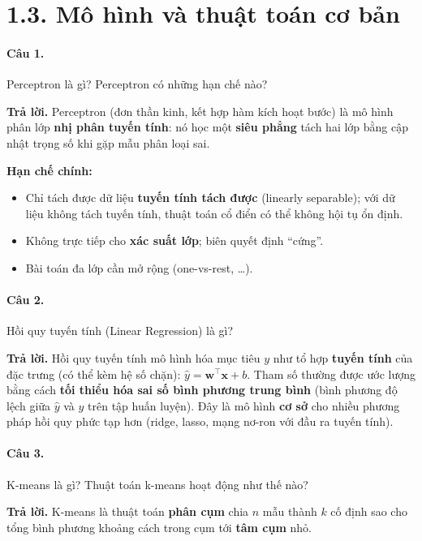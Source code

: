 \section*{1.3. Mô hình và thuật toán cơ bản}

\paragraph{Câu 1.} Perceptron là gì? Perceptron có những hạn chế nào?

\medskip\noindent\textbf{Trả lời.} Perceptron (đơn thần kinh, kết hợp hàm kích hoạt bước) là mô hình phân lớp \textbf{nhị phân tuyến tính}: nó học một \textbf{siêu phẳng} tách hai lớp bằng cập nhật trọng số khi gặp mẫu phân loại sai.

\textbf{Hạn chế chính:}
\begin{itemize}[nosep]
\item Chỉ tách được dữ liệu \textbf{tuyến tính tách được} (linearly separable); với dữ liệu không tách tuyến tính, thuật toán cổ điển có thể không hội tụ ổn định.
\item Không trực tiếp cho \textbf{xác suất lớp}; biên quyết định ``cứng''.
\item Bài toán đa lớp cần mở rộng (one-vs-rest, \ldots).
\end{itemize}

\paragraph{Câu 2.} Hồi quy tuyến tính (Linear Regression) là gì?

\medskip\noindent\textbf{Trả lời.} Hồi quy tuyến tính mô hình hóa mục tiêu $y$ như tổ hợp \textbf{tuyến tính} của đặc trưng (có thể kèm hệ số chặn): $\hat{y} = \mathbf{w}^{\top}\mathbf{x} + b$. Tham số thường được ước lượng bằng cách \textbf{tối thiểu hóa sai số bình phương trung bình} (bình phương độ lệch giữa $\hat{y}$ và $y$ trên tập huấn luyện). Đây là mô hình \textbf{cơ sở} cho nhiều phương pháp hồi quy phức tạp hơn (ridge, lasso, mạng nơ-ron với đầu ra tuyến tính).

\paragraph{Câu 3.} K-means là gì? Thuật toán k-means hoạt động như thế nào?

\medskip\noindent\textbf{Trả lời.} K-means là thuật toán \textbf{phân cụm} chia $n$ mẫu thành $k$ cố định sao cho tổng bình phương khoảng cách trong cụm tới \textbf{tâm cụm} nhỏ.

